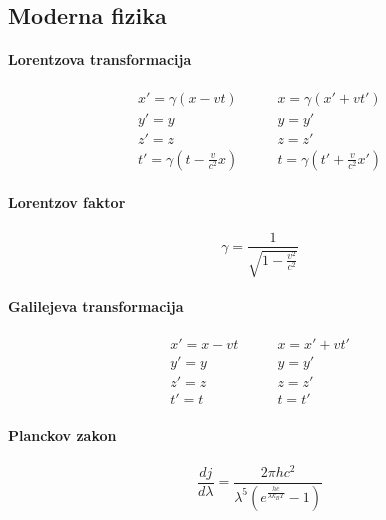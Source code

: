 \documentclass[a4paper,12pt]{article}
\begin{document}
\subsection{Moderna fizika}
\begin{multicols}{2}
    \paragraph{Lorentzova transformacija} \label{eq:lorentzova_transformacija}
    \begin{align}
        x' = \gamma (x - vt)              & \qquad x = \gamma (x' + vt')              \\
        y' = y                            & \qquad y = y'                             \\
        z' = z                            & \qquad z = z'                             \\
        t' = \gamma (t - \frac{v}{c^2} x) & \qquad t = \gamma (t' + \frac{v}{c^2} x')
    \end{align}

    \paragraph{Lorentzov faktor}
    \begin{equation}
        \gamma = \frac{1}{\sqrt{1 - \frac{v^2}{c^2}}}
    \end{equation}

    \paragraph{Galilejeva transformacija}
    \begin{align}
        x' = x - vt & \qquad x = x' + vt' \\
        y' = y      & \qquad y = y'       \\
        z' = z      & \qquad z = z'       \\
        t' = t      & \qquad t = t'
    \end{align}

    \paragraph{Planckov zakon} \label{eq:planckov_zakon}
    \begin{equation}
        \frac{dj}{d\lambda} = \frac{2 \pi hc^2}{\lambda^5\left(e^{\frac{hc}{\lambda k_B T}} - 1\right)}
    \end{equation}
\end{multicols}
\end{document}
